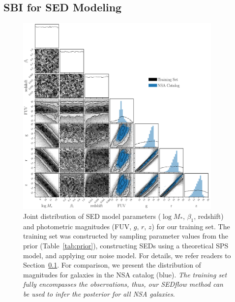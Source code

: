 \subsection{SBI for SED Modeling} \label{sec:sbi_sed}



\begin{figure}
\begin{center}
\includegraphics[width=0.9\textwidth]{figs/sbi.pdf}
    \caption{\label{fig:sbi}
    Joint distribution of SED model parameters ($\log M_*$, $\beta_1$,
    redshift) and photometric magnitudes (FUV, $g$, $r$, $z$) for our training
    set. 
    The training set was constructed by sampling parameter values from the
    prior (Table~\ref{tab:prior}), constructing SEDs using a theoretical SPS
    model, and applying our noise model. 
    For details, we refer readers to Section~\ref{sec:sbi_sed}.
    For comparison, we present the distribution of magnitudes for galaxies in
    the NSA catalog (blue). 
    \emph{The training set fully encompasses the observations, thus, our 
    {\sc SEDflow} method can be used to infer the posterior for all NSA
    galaxies}.
    }
\end{center}
\end{figure}


